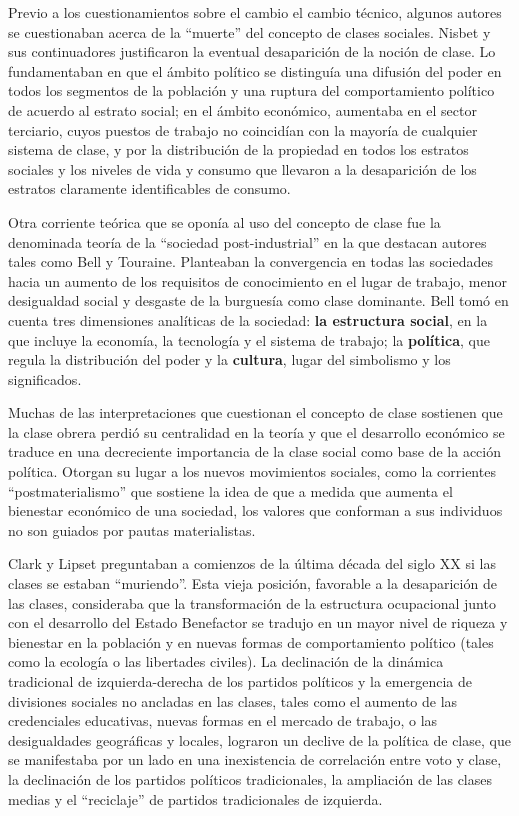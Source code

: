 \documentclass[
]{book}
\begin{document}
Previo a los cuestionamientos sobre el cambio el cambio técnico, algunos autores se cuestionaban acerca de la ``muerte'' del concepto de clases sociales. Nisbet \citeyearpar{Nisbet1959} y sus continuadores justificaron la eventual desaparición de la noción de clase. Lo fundamentaban en que el ámbito político se distinguía una difusión del poder en todos los segmentos de la población y una ruptura del comportamiento político de acuerdo al estrato social; en el ámbito económico, aumentaba en el sector terciario, cuyos puestos de trabajo no coincidían con la mayoría de cualquier sistema de clase, y por la distribución de la propiedad en todos los estratos sociales y los niveles de vida y consumo que llevaron a la desaparición de los estratos claramente identificables de consumo.

Otra corriente teórica que se oponía al uso del concepto de clase fue la denominada teoría de la ``sociedad post-industrial'' en la que destacan autores tales como Bell y Touraine. Planteaban la convergencia en todas las sociedades hacia un aumento de los requisitos de conocimiento en el lugar de trabajo, menor desigualdad social y desgaste de la burguesía como clase dominante. Bell \citeyearpar{Bell2006} tomó en cuenta tres dimensiones analíticas de la sociedad: \textbf{la estructura social}, en la que incluye la economía, la tecnología y el sistema de trabajo; la \textbf{política}, que regula la distribución del poder y la \textbf{cultura}, lugar del simbolismo y los significados.

Muchas de las interpretaciones que cuestionan el concepto de clase sostienen que la clase obrera perdió su centralidad en la teoría y que el desarrollo económico se traduce en una decreciente importancia de la clase social como base de la acción política. Otorgan su lugar a los nuevos movimientos sociales, como la corrientes ``postmaterialismo'' \citep{Inglehart1990} que sostiene la idea de que a medida que aumenta el bienestar económico de una sociedad, los valores que conforman a sus individuos no son guiados por pautas materialistas.

Clark y Lipset \citeyearpar{Clark1991} preguntaban a comienzos de la última década del siglo XX si las clases se estaban ``muriendo''. Esta vieja posición, favorable a la desaparición de las clases, consideraba que la transformación de la estructura ocupacional junto con el desarrollo del Estado Benefactor se tradujo en un mayor nivel de riqueza y bienestar en la población y en nuevas formas de comportamiento político (tales como la ecología o las libertades civiles). La declinación de la dinámica tradicional de izquierda-derecha de los partidos políticos y la emergencia de divisiones sociales no ancladas en las clases, tales como el aumento de las credenciales educativas, nuevas formas en el mercado de trabajo, o las desigualdades geográficas y locales, lograron un declive de la política de clase, que se manifestaba por un lado en una inexistencia de correlación entre voto y clase, la declinación de los partidos políticos tradicionales, la ampliación de las clases medias y el ``reciclaje'' de partidos tradicionales de izquierda.
\end{document}
